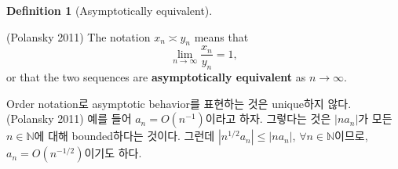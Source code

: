 \documentclass[
  13pt,
  letterpaper,
  DIV=11,
  numbers=noendperiod]{scrreprt}
\theoremstyle{plain}
\theoremstyle{definition}
\theoremstyle{definition}
\newtheorem{definition}{Definition}[chapter]
\theoremstyle{plain}
\theoremstyle{definition}
\theoremstyle{plain}
\theoremstyle{remark}
\begin{document}
\begin{definition}[Asymptotically
equivalent]\protect\hypertarget{def-asymptequiv}{}\label{def-asymptequiv}

(Polansky 2011) The notation \(x_n \asymp y_n\) means that \[
\lim_{n\rightarrow\infty} \frac{x_n}{y_n}=1,
\] or that the two sequences are \textbf{asymptotically equivalent} as
\(n\rightarrow\infty\).

\end{definition}

\begin{tcolorbox}[enhanced jigsaw, opacitybacktitle=0.6, bottomrule=.15mm, title=\textcolor{quarto-callout-tip-color}{\faLightbulb}\hspace{0.5em}{Remark}, leftrule=.75mm, rightrule=.15mm, arc=.35mm, left=2mm, titlerule=0mm, colbacktitle=quarto-callout-tip-color!10!white, bottomtitle=1mm, colframe=quarto-callout-tip-color-frame, toptitle=1mm, coltitle=black, breakable, colback=white, toprule=.15mm, opacityback=0]

Order notation로 asymptotic behavior를 표현하는 것은 unique하지 않다.
(Polansky 2011) 예를 들어 \(a_n = O(n^{-1})\)이라고 하자. 그렇다는 것은
\(\vert n a_n \vert\)가 모든 \(n\in \mathbb{N}\)에 대해 bounded하다는
것이다. 그런데 \(|n^{1/2}a_n| \leq |na_n|\),
\(\forall n\in\mathbb{N}\)이므로, \(a_n = O(n^{-1/2})\)이기도 하다.

\end{tcolorbox}
\end{document}
